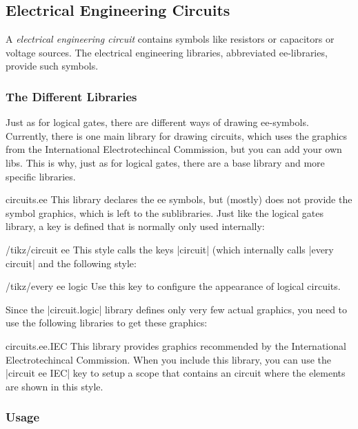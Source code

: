 \subsection{Electrical Engineering Circuits}

A \emph{electrical engineering circuit} contains symbols like
resistors or capacitors or voltage sources. The electrical engineering
libraries, abbreviated ee-libraries, provide such symbols. 


\subsubsection{The Different Libraries}

Just as for logical gates, there are different ways of drawing
ee-symbols. Currently, there is one main library for drawing circuits,
which uses the graphics from the International Electrotechincal
Commission, but you can add your own libs. This is why, just as for
logical gates, there are a base library and more specific libraries.

\begin{tikzlibrary}{circuits.ee}
  This library declares the ee symbols, but (mostly) does not 
  provide the symbol graphics, which is left to the sublibraries.
  Just like the logical gates library, a key is defined that is
  normally only used internally:
  \begin{key}{/tikz/circuit ee}
    This style calls the keys |circuit| (which internally calls
    |every circuit| and the following style:
    \begin{stylekey}{/tikz/every ee logic}
      Use this key to configure the appearance of logical circuits.      
    \end{stylekey}
  \end{key}
\end{tikzlibrary}

Since the |circuit.logic| library defines only very few actual
graphics, you need to use the following libraries to get these
graphics: 

\begin{pgflibrary}{circuits.ee.IEC}
  This library provides graphics recommended by the International
  Electrotechincal Commission.  When you include this library, you can
  use the |circuit ee IEC| key to setup a scope that contains an
  circuit where the elements are shown in this style.
\end{pgflibrary}



\subsubsection{Usage}

